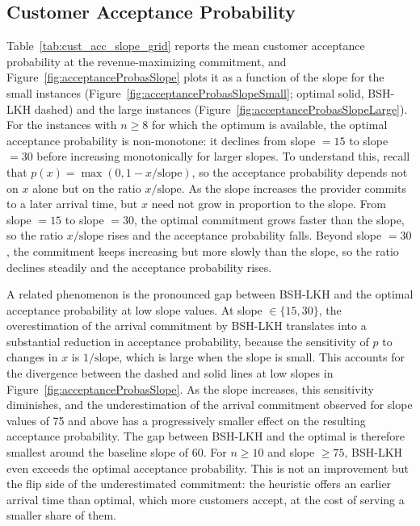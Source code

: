 \documentclass[11pt]{article}
\theoremstyle{plain}
\theoremstyle{definition}
\begin{document}
\subsection{Customer Acceptance Probability}
Table~\ref{tab:cust_acc_slope_grid} reports the mean customer acceptance probability at
the revenue-maximizing commitment, and Figure~\ref{fig:acceptanceProbasSlope} plots it as
a function of the slope for the small instances (Figure~\ref{fig:acceptanceProbasSlopeSmall};
optimal solid, BSH-\ac{LKH} dashed) and the large instances
(Figure~\ref{fig:acceptanceProbasSlopeLarge}). For the instances with $n \geq 8$ for which
the optimum is available, the optimal acceptance probability is non-monotone: it declines
from slope $= 15$ to slope $= 30$ before increasing monotonically for larger slopes. To
understand this, recall that $p(x) = \max(0, 1 - x/\text{slope})$, so the acceptance
probability depends not on $x$ alone but on the ratio $x/\text{slope}$. As the slope
increases the provider commits to a later arrival time, but $x$ need not grow in proportion
to the slope. From slope $= 15$ to slope $= 30$, the optimal commitment grows faster than
the slope, so the ratio $x/\text{slope}$ rises and the acceptance probability falls. Beyond
slope $= 30$, the commitment keeps increasing but more slowly than the slope, so the ratio
declines steadily and the acceptance probability rises.

A related phenomenon is the pronounced gap between BSH-\ac{LKH} and the optimal
acceptance probability at low slope values. At slope $\in \{15, 30\}$, the
overestimation of the arrival commitment by BSH-\ac{LKH} translates into a substantial
reduction in acceptance probability, because the sensitivity of $p$ to changes in
$x$ is $1/\text{slope}$, which is large when the slope is small. This accounts for
the divergence between the dashed and solid lines at low slopes in
Figure~\ref{fig:acceptanceProbasSlope}. As the slope increases, this sensitivity
diminishes, and the underestimation of the arrival commitment observed for slope
values of 75 and above has a progressively smaller effect on the resulting acceptance
probability. The gap between BSH-\ac{LKH} and the optimal is therefore smallest around
the baseline slope of 60. For $n \geq 10$ and slope $\geq 75$, BSH-\ac{LKH} even exceeds
the optimal acceptance probability. This is not an improvement but the flip side of the
underestimated commitment: the heuristic offers an earlier arrival time than optimal,
which more customers accept, at the cost of serving a smaller share of them.
\end{document}
